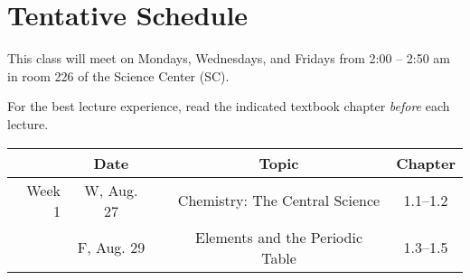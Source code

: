 \documentclass[12pt, letterpaper]{article}
\begin{document}
\section*{Tentative Schedule}
This class will meet on Mondays, Wednesdays, and Fridays from 2:00  -- 2:50 am in room 226 of the Science Center (SC).


\noindent For the best lecture experience, read the indicated textbook chapter \emph{before} each lecture.

\noindent
\begin{tabular}{rcccc}
& Date && Topic & Chapter\\
\midrule
Week 1 & W, Aug. 27&& Chemistry: The Central Science & 1.1--1.2\\
& F, Aug. 29&& Elements and the Periodic Table & 1.3--1.5\\
\end{tabular}
\end{document}
